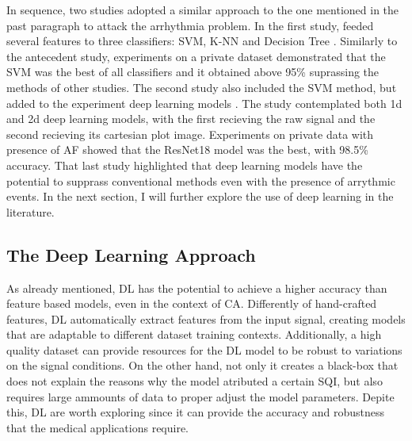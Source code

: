 In sequence, two studies adopted a similar approach to the one mentioned in the past paragraph to attack the arrhythmia problem. In the first study, \citeauthor{review-6} feeded several features to three classifiers: \acrshort{SVM}, \acrshort{K-NN} and Decision Tree \cite{review-6}. Similarly to the antecedent study, experiments on a private dataset demonstrated that the \acrshort{SVM} was the best of all classifiers and it obtained above 95\% suprassing the methods of other studies. The second study also included the \acrshort{SVM} method, but added to the experiment deep learning models \cite{review-7}. The study contemplated both 1d and 2d deep learning models, with the first recieving the raw signal and the second recieving its cartesian plot image. Experiments on private data with presence of \acrshort{AF} showed that the ResNet18 model was the best, with 98.5\% accuracy. That last study highlighted that deep learning models have the potential to supprass conventional methods even with the presence of arrythmic events. In the next section, I will further explore the use of deep learning in the literature.  

\subsection{The Deep Learning Approach}
\label{sec:deep_learning}

As already mentioned, \acrfull{DL} has the potential to achieve a higher accuracy than feature based models, even in the context of \acrshort{CA}. Differently of hand-crafted features, \acrshort{DL} automatically extract features from the input signal, creating models that are adaptable to different dataset training contexts. Additionally, a high quality dataset can provide resources for the \acrshort{DL} model to be robust to variations on the signal conditions. On the other hand, not only it creates a black-box that does not explain the reasons why the model atributed a certain \acrshort{SQI}, but also requires large ammounts of data to proper adjust the model parameters. Depite this, \acrshort{DL} are worth exploring since it can provide the accuracy and robustness that the medical applications require. 

